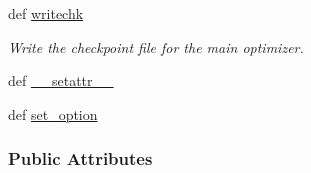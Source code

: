 \begin{DoxyCompactItemize}
def \hyperlink{classforcebalance_1_1optimizer_1_1Optimizer_aa7ac7cda43b70ac58ccbd6c8445e88ef}{writechk}
\begin{DoxyCompactList}\small\item\em Write the checkpoint file for the main optimizer. \end{DoxyCompactList}\item 
def \hyperlink{classforcebalance_1_1BaseClass_a0c851d413c3b2f30561b72a46771bcff}{\-\_\-\-\_\-setattr\-\_\-\-\_\-}
\item 
def \hyperlink{classforcebalance_1_1BaseClass_a73e9a37a7632e79eb99f49bd15aced45}{set\-\_\-option}
\end{DoxyCompactItemize}
\subsubsection*{Public Attributes}
